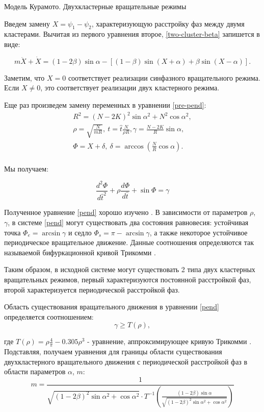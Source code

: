 \begin{chapter}{Модель Курамото. Двухкластерные вращательные режимы}
	
	Введем замену $X = \psi_1 - \psi_2$, характеризующую расстройку фаз между двумя кластерами.
	Вычитая из первого уравнения второе, \ref{two-cluster-beta} запишется в виде:
	
	\begin{equation} \label{pre-pend}
		m\ddot{X} + \dot{X} = (1 - 2 \beta) \sin{\alpha} - \left[(1-\beta)\sin{(X + \alpha)} + \beta\sin{(X - \alpha)} \right].
	\end{equation}
	
	Заметим, что $X = 0$ соответствует реализации
	синфазного вращательного режима. Если $X \neq 0$,
	это соответствует реализации двух кластерного режима. 
	
	Еще раз произведем замену переменных в уравнении \ref{pre-pend}:
	\begin{align*}
	R^2 = (N - 2K)^2 \sin{\alpha}^2 + N^2 \cos{\alpha}^2, \\
	\rho = \sqrt{\frac{N}{m R}}, \ t = \hat{t} \frac{N}{\rho R}, \gamma = \frac{N - 2K}{R}\sin{\alpha}, \\
	\Phi = X + \delta, \ \delta = \arccos{(\frac{N}{R}\cos{\alpha})}. \\
	\end{align*}
	
	Мы получаем:
	
	\begin{equation} \label{pend}
		\frac{d^2 \Phi }{d\hat{t}^2} + \rho \frac{d\Phi}{d\hat{t}} + \sin{\Phi} = \gamma
	\end{equation}

	Полученное уравнение \ref{pend} хорошо изучено \cite{Andronov:Vitt}. 
	В зависимости от параметров $\rho$, $\gamma$, в системе \ref{pend}
	могут существовать два состояния равновесия:
	устойчивая точка $\Phi_e = \arcsin{\gamma}$ и седло
	$\Phi_s = \pi - \arcsin{\gamma}$, а также
	некоторое устойчивое периодическое вращательное движение.
	Данные соотношения определяются так называемой
	бифуркационной кривой Трикомми \cite{Andronov:Vitt}.

	Таким образом, в исходной системе могут существовать 2 типа
	двух кластерных вращательных режимов, первый характеризуются
	постоянной расстройкой фаз, второй характеризуется
	периодической расстройкой фаз.
	
	Область существования вращательного движения в уравнении \ref{pend}
	определяется соотношением:
	\begin{equation}
		\gamma \ge T(\rho),
	\end{equation}

	где $T(\rho) = \rho\frac{4}{\pi} - 0.305\rho^3$ - уравнение, аппроксимирующее кривую Трикомми \cite{Belykh:Brister}.
	Подставляя, получаем уравнения для границы области существования двухкластерного вращательного движения с
	периодической расстройкой фаз в области параметров $\alpha$, $m$:
	\begin{equation} \label{borders}
		m = \frac{1}{\sqrt{(1 - 2\beta)^2\sin{\alpha}^2 + \cos{\alpha}^2} \cdot T^{-1}(\frac{(1 - 2\beta)\sin{\alpha}}{\sqrt{(1 - 2\beta)^2\sin{\alpha}^2 + \cos{\alpha}^2}})}
	\end{equation}


\end{chapter}
